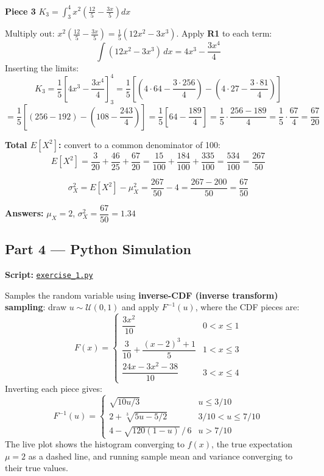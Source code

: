 \documentclass[12pt, a4paper]{article}
\begin{document}
\medskip
\textbf{Piece 3} \quad $K_3 = \displaystyle\int_3^4 x^2\!\left(\frac{12}{5}-\frac{3x}{5}\right)dx$

Multiply out: $x^2\!\left(\tfrac{12}{5}-\tfrac{3x}{5}\right) = \tfrac{1}{5}(12x^2-3x^3)$.
Apply \textbf{R1} to each term:
\[
  \int(12x^2-3x^3)\,dx = 4x^3-\frac{3x^4}{4}
\]
Inserting the limits:
\[
  K_3 = \frac{1}{5}\left[4x^3-\frac{3x^4}{4}\right]_3^4
      = \frac{1}{5}\left[
          \left(4\cdot64-\frac{3\cdot256}{4}\right)
        - \left(4\cdot27-\frac{3\cdot81}{4}\right)
        \right]
\]
\[
      = \frac{1}{5}\left[(256-192)-\left(108-\frac{243}{4}\right)\right]
      = \frac{1}{5}\left[64-\frac{189}{4}\right]
      = \frac{1}{5}\cdot\frac{256-189}{4}
      = \frac{1}{5}\cdot\frac{67}{4}
      = \frac{67}{20}
\]

\medskip
\textbf{Total $E[X^2]$:} convert to a common denominator of 100:
\[
  E[X^2] = \frac{3}{20}+\frac{46}{25}+\frac{67}{20}
         = \frac{15}{100}+\frac{184}{100}+\frac{335}{100}
         = \frac{534}{100}
         = \frac{267}{50}
\]

\[
  \boxed{\sigma_X^2 = E[X^2]-\mu_X^2 = \frac{267}{50}-4 = \frac{267-200}{50} = \frac{67}{50}}
\]

\begin{keybox}
  \textbf{Answers:} $\mu_X = 2$, \quad $\sigma_X^2 = \dfrac{67}{50} = 1.34$
\end{keybox}

\subsection*{Part 4 --- Python Simulation}

\begin{notebox}
  \textbf{Script:} \href{run:exercise_1.py}{\texttt{exercise\_1.py}}

  Samples the random variable using \textbf{inverse-CDF (inverse transform)
  sampling}: draw $u \sim \mathcal{U}(0,1)$ and apply $F^{-1}(u)$, where
  the CDF pieces are:
  \[
    F(x) =
    \begin{cases}
      \dfrac{3x^2}{10}                          & 0 < x \leq 1 \\[6pt]
      \dfrac{3}{10} + \dfrac{(x-2)^3+1}{5}      & 1 < x \leq 3 \\[6pt]
      \dfrac{24x - 3x^2 - 38}{10}               & 3 < x \leq 4
    \end{cases}
  \]
  Inverting each piece gives:
  \[
    F^{-1}(u) =
    \begin{cases}
      \sqrt{10u/3}                               & u \leq 3/10 \\[4pt]
      2 + \sqrt[3]{5u - 5/2}                     & 3/10 < u \leq 7/10 \\[4pt]
      4 - \sqrt{120(1-u)}\,/\,6                  & u > 7/10
    \end{cases}
  \]
  The live plot shows the histogram converging to $f(x)$, the true
  expectation $\mu=2$ as a dashed line, and running sample mean and
  variance converging to their true values.
\end{notebox}
\end{document}
